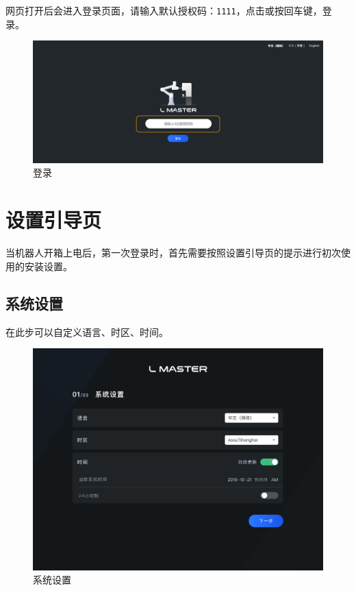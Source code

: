 网页打开后会进入登录页面，请输入默认授权码：\verb|1111|，点击或按回车键，登录\LM。

\begin{figure}[ht]
    \centering
    \includegraphics[width=\textwidth]{image/31.pdf}
    \caption{登录\LM}
    \label{fig:登录LM}
\end{figure}

\section{设置引导页}

当机器人开箱上电后，第一次登录\LM 时，首先需要按照设置引导页的提示进行初次使用的安装设置。
\subsection{系统设置}
在此步可以自定义语言、时区、时间。

\begin{figure}[ht]
    \centering
    \includegraphics[width=\textwidth]{image/34.pdf}
    \caption{系统设置}
    \label{fig:系统设置}
\end{figure}

